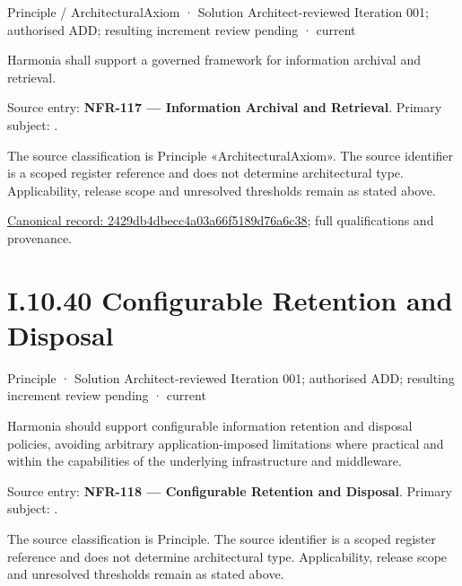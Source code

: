 \label{element:2429db4dbecc4a03a66f5189d76a6c38}
{\small Principle / ArchitecturalAxiom · Solution Architect-reviewed Iteration 001; authorised ADD; resulting increment review pending · current}\par

Harmonia shall support a governed framework for information archival and retrieval.



Source entry: \textbf{NFR-117 — Information Archival and Retrieval}. Primary subject: \texttt{}.



The source classification is Principle «ArchitecturalAxiom». The source identifier is a scoped register reference and does not determine architectural type. Applicability, release scope and unresolved thresholds remain as stated above.


{\footnotesize \href{../../../../../../../../continuum/motivation/principle/architectural-axiom/2429db4dbecc4a03a66f5189d76a6c38.md}{Canonical record: 2429db4dbecc4a03a66f5189d76a6c38}; full qualifications and provenance.}\par
\section*{I.10.40 Configurable Retention and Disposal}
\label{navigation:I.10.40}

\label{element:b1a46fce85b4448fba55987af146d61e}
{\small Principle · Solution Architect-reviewed Iteration 001; authorised ADD; resulting increment review pending · current}\par

Harmonia should support configurable information retention and disposal policies, avoiding arbitrary application-imposed limitations where practical and within the capabilities of the underlying infrastructure and middleware.



Source entry: \textbf{NFR-118 — Configurable Retention and Disposal}. Primary subject: \texttt{}.



The source classification is Principle. The source identifier is a scoped register reference and does not determine architectural type. Applicability, release scope and unresolved thresholds remain as stated above.


